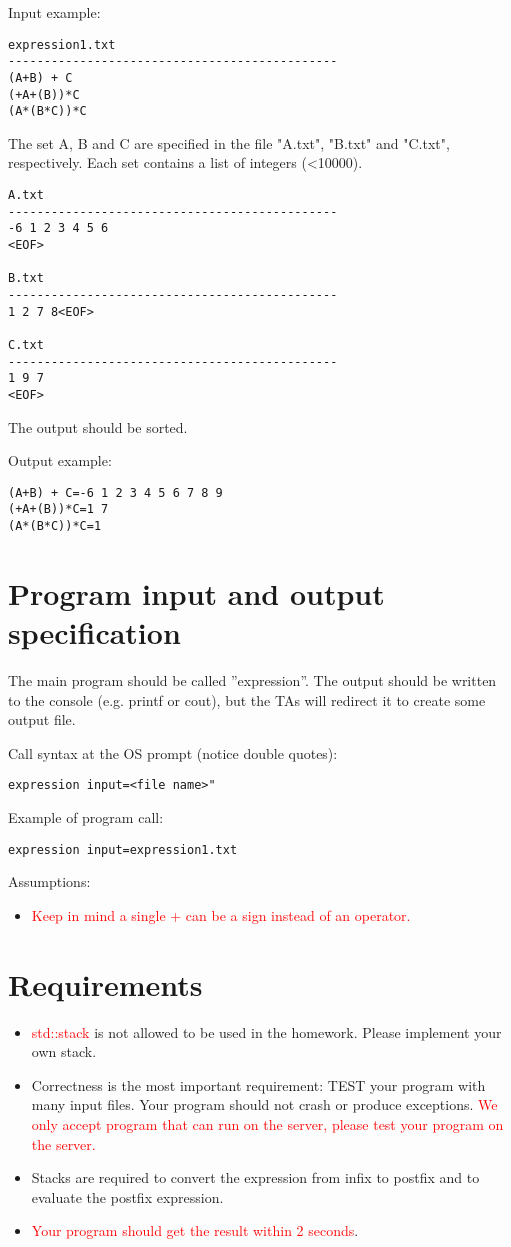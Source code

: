 Input example:
\begin{verbatim}
expression1.txt
----------------------------------------------
(A+B) + C
(+A+(B))*C
(A*(B*C))*C
\end{verbatim}
The set A, B and C are specified in the file "A.txt", "B.txt" and "C.txt", respectively. Each set contains a list of integers (<10000).
\begin{verbatim}
A.txt
----------------------------------------------
-6 1 2 3 4 5 6
<EOF>

B.txt
----------------------------------------------
1 2 7 8<EOF>

C.txt
----------------------------------------------
1 9 7
<EOF>
\end{verbatim}

The output should be sorted.
 
Output example:
\begin{verbatim}
(A+B) + C=-6 1 2 3 4 5 6 7 8 9
(+A+(B))*C=1 7
(A*(B*C))*C=1
\end{verbatim}

\section{Program input and output specification}
The main program should be called ”expression”. The output should be written to the console (e.g.
printf or cout), but the TAs will redirect it to create some output file.

Call syntax at the OS prompt (notice double quotes):
\begin{verbatim}
expression input=<file name>"
\end{verbatim}

Example of program call:
\begin{verbatim}
expression input=expression1.txt
\end{verbatim}
Assumptions:
\begin{itemize}
\item \textcolor{red}{Keep in mind a single + can be a sign instead of an operator.}
\end{itemize}

\section{Requirements}

\begin{itemize}
\item \textcolor{red}{std::stack} is not allowed to be used in the homework. Please implement your own stack.
\item Correctness is the most important requirement: TEST your program with many input files. Your
program should not crash or produce exceptions. \textcolor{red}{We only accept program that can run on the server, please test your program on the server.}
\item Stacks are required to convert the expression from infix to postfix and to evaluate the postfix expression.
\item \textcolor{red}{Your program should get the result within 2 seconds}.
\end{itemize}


% 



